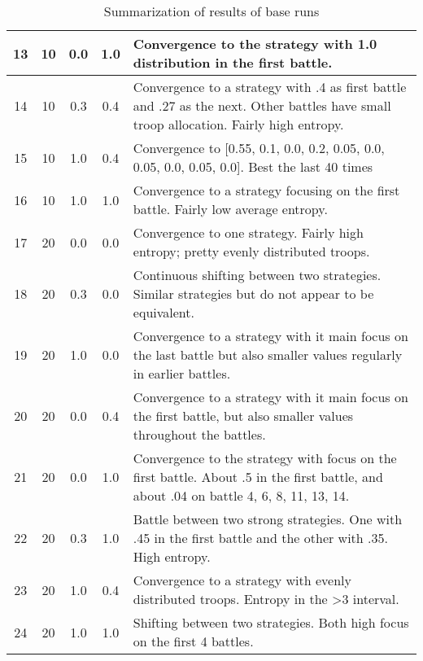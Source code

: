 \begin{center}
\begin{table}[H]
\begin{tabularx}{\textwidth}{ | c | c | c | c | X | }
    13 & 10 & 0.0 & 1.0 &
    Convergence to the strategy with 1.0 distribution in the first battle.
    \\ \hline
    14 & 10 & 0.3 & 0.4 &
    Convergence to a strategy with .4 as first battle and .27 as the next. Other battles have small troop allocation. Fairly high entropy.
    \\ \hline
    15 & 10 & 1.0 & 0.4 &
    Convergence to [0.55, 0.1, 0.0, 0.2, 0.05, 0.0, 0.05, 0.0, 0.05, 0.0]. Best the last 40 times
    \\ \hline
    16 & 10 & 1.0 & 1.0 &
    Convergence to a strategy focusing on the first battle. Fairly low average entropy.
    \\ \hline
    17 & 20 & 0.0 & 0.0 & 
    Convergence to one strategy. Fairly high entropy; pretty evenly distributed troops.
    \\ \hline
    18 & 20 & 0.3 & 0.0 & 
    Continuous shifting between two strategies. Similar strategies but do not appear to be equivalent.
    \\ \hline
    19 & 20 & 1.0 & 0.0 &
    Convergence to a strategy with it main focus on the last battle but also smaller values regularly in earlier battles.
    \\ \hline
    20 & 20 & 0.0 & 0.4 &
    Convergence to a strategy with it main focus on the first battle, but also smaller values throughout the battles.  
    \\ \hline
    21 & 20 & 0.0 & 1.0 &
    Convergence to the strategy with focus on the first battle. About .5 in the first battle, and about .04 on battle 4, 6, 8, 11, 13, 14.
    \\ \hline
    22 & 20 & 0.3 & 1.0 &
    Battle between two strong strategies. One with .45 in the first battle and the other with .35. High entropy.
    \\ \hline
    23 & 20 & 1.0 & 0.4 &
    Convergence to a strategy with evenly distributed troops. Entropy in the >3 interval.
    \\ \hline
    24 & 20 & 1.0 & 1.0 &
    Shifting between two strategies. Both high focus on the first 4 battles.
    \\ \hline
\end{tabularx}
\caption{Summarization of results of base runs}
\label{tab:baseruns}
\end{table}
\end{center}
